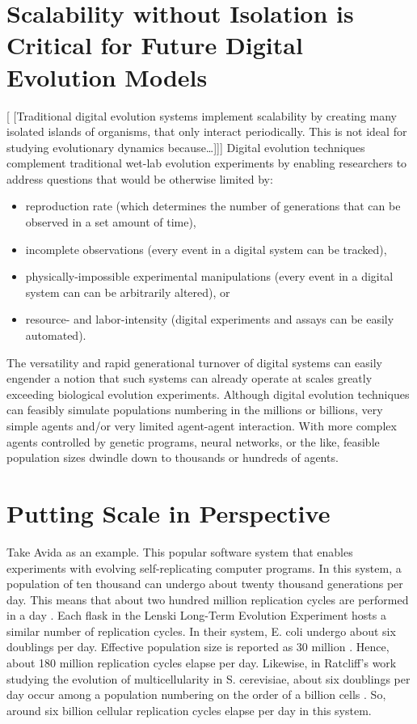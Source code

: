 \section{Scalability without Isolation is Critical for Future Digital Evolution Models}
[
[Traditional digital evolution systems implement scalability by creating many isolated islands of organisms, that only interact periodically.
This is not ideal for studying evolutionary dynamics because…]]]
Digital evolution techniques complement traditional wet-lab evolution experiments by enabling researchers to address questions that would be otherwise limited by:
\begin{itemize}
\item reproduction rate (which determines the number of generations that can be observed in a set amount of time),
\item incomplete observations (every event in a digital system can be tracked),
\item physically-impossible experimental manipulations (every event in a digital system can can be arbitrarily altered), or
\item resource- and labor-intensity (digital experiments and assays can be easily automated).
\end{itemize}
The versatility and rapid generational turnover of digital systems can easily engender a notion that such systems can already operate at scales greatly exceeding biological evolution experiments.
Although digital evolution techniques can feasibly simulate populations numbering in the millions or billions, very simple agents and/or very limited agent-agent interaction.
With more complex agents controlled by genetic programs, neural networks, or the like, feasible population sizes dwindle down to thousands or hundreds of agents.

\section{Putting Scale in Perspective}

Take Avida as an example. This popular software system that enables experiments with evolving self-replicating computer programs.
In this system, a population of ten thousand can undergo about twenty thousand generations per day.
This means that about two hundred million replication cycles are performed in a day \citep{ofria2009artificial}.
Each flask in the Lenski Long-Term Evolution Experiment hosts a similar number of replication cycles.
In their system, E. coli undergo about six doublings per day.
Effective population size is reported as 30 million \citep{good2017dynamics}. Hence, about 180 million replication cycles elapse per day.
Likewise, in Ratcliff’s work studying the evolution of multicellularity in S. cerevisiae, about six doublings per day occur among a population numbering on the order of a billion cells \citep{ratcliff2012experimental}.
So, around six billion cellular replication cycles elapse per day in this system.

